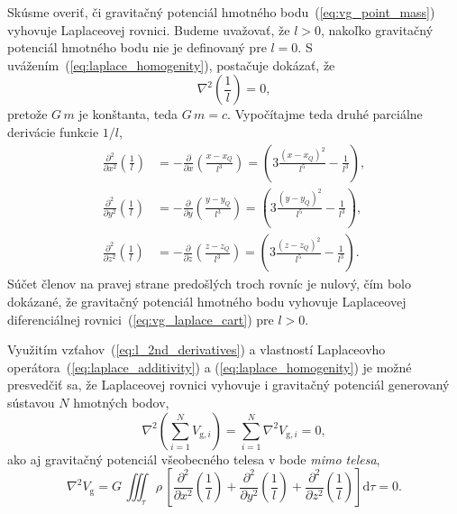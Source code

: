 \documentclass[a4paper, 12pt]{book}
\newcommand{\diff}{\mathrm d}
\newcommand{\gidx}{\mathrm g}
\begin{document}
Skúsme overiť, či gravitačný potenciál hmotného bodu~(\ref{eq:vg_point_mass}) 
vyhovuje Laplaceovej rovnici.  Budeme uvažovať, že $l > 0$, nakoľko gravitačný 
potenciál hmotného bodu nie je definovaný pre $l = 0$.  
S uvážením~(\ref{eq:laplace_homogenity}), postačuje dokázať, že
%
\begin{equation}
\nabla^2 \left( \frac{1}{l} \right) = 0{,}
\end{equation}
%
pretože $G \, m$ je konštanta, teda $G \, m = c$.  Vypočítajme teda druhé 
parciálne derivácie funkcie $1 \slash l$,
%
\begin{equation}
\label{eq:l_2nd_derivatives}
\begin{split}
\frac{\partial^2}{\partial x^2} \left( \frac{1}{l} \right) &= 
-\frac{\partial}{\partial x} \left( \frac{x - x_Q}{l^3} \right) = \left(3 
\frac{(x - x_Q)^2}{l^5} - \frac{1}{l^3} \right){,}\\
%
\frac{\partial^2}{\partial y^2} \left( \frac{1}{l} \right) &= 
-\frac{\partial}{\partial y} \left( \frac{y - y_Q}{l^3} \right) = \left(3 
\frac{(y - y_Q)^2}{l^5} - \frac{1}{l^3} \right){,}\\
%
\frac{\partial^2}{\partial z^2} \left( \frac{1}{l} \right) &= 
-\frac{\partial}{\partial z} \left( \frac{z - z_Q}{l^3} \right) = \left(3 
\frac{(z - z_Q)^2}{l^5} - \frac{1}{l^3} \right){.}
\end{split}
\end{equation}
%
Súčet členov na pravej strane predošlých troch rovníc je nulový, čím bolo 
dokázané, že gravitačný potenciál hmotného bodu vyhovuje Laplaceovej 
diferenciálnej rovnici~(\ref{eq:vg_laplace_cart}) pre $l > 0$.

Využitím vzťahov~(\ref{eq:l_2nd_derivatives}) a vlastností Laplaceovho 
operátora~(\ref{eq:laplace_additivity}) a (\ref{eq:laplace_homogenity}) je 
možné presvedčiť sa, že Laplaceovej rovnici vyhovuje i gravitačný potenciál 
generovaný sústavou $N$ hmotných bodov,
%
\begin{equation}
\nabla^2 \left( \sum_{i = 1}^N V_{\gidx,i} \right) = \sum_{i = 1}^N \nabla^2 
V_{\gidx,i} = 0{,}
\end{equation}
%
ako aj gravitačný potenciál všeobecného telesa v bode \emph{mimo telesa},
%
\begin{equation}
\nabla^2 V_\gidx = G\, \iiint_\tau \rho \, \left[ \frac{\partial^2}{\partial 
x^2}\left(\frac{1}{l}\right) + \frac{\partial^2}{\partial 
y^2}\left(\frac{1}{l}\right) + \frac{\partial^2}{\partial 
z^2}\left(\frac{1}{l}\right) \right] \diff\tau = 0{.}
\end{equation}
\end{document}
